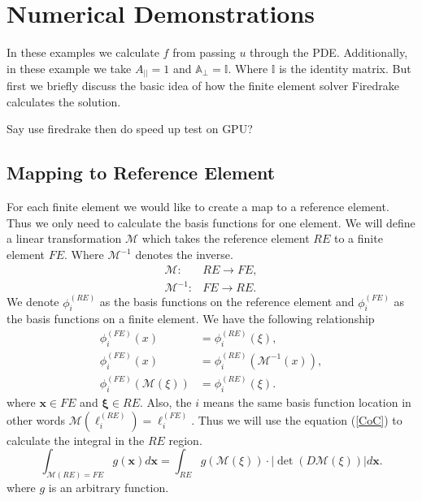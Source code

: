 \documentclass[12pt]{ociamthesis}
\begin{document}
\chapter{Numerical Demonstrations}
In these examples we calculate $f$ from passing $u$ through the PDE. Additionally, in these example we take $A_{||}=1$ and $\mathbb{A}_{\perp} = \mathbb{I}$. Where $\mathbb{I}$ is the identity matrix. But first we briefly discuss the basic idea of how the finite element solver Firedrake \cite{Dragon} calculates the solution. 

Say use firedrake then do speed up test on GPU?

\section{Mapping to Reference Element} \label{RE}
For each finite element we would like to create a map to a reference element. Thus we only need to calculate the basis functions for one element. We will define a linear transformation $\mathcal{M}$ which takes the reference element $RE$ to a finite element $FE$. Where $\mathcal{M}^{-1}$ denotes the inverse. 
\begin{align}
\mathcal{M}: &RE \rightarrow FE, \\
\mathcal{M}^{-1}: &FE \rightarrow RE.
\end{align}
We denote $\phi_i^{(RE)}$ as the basis functions on the reference element and $\phi_i^{(FE)}$ as the basis functions on a finite element. We have the following relationship
\begin{align}
\phi_i^{(FE)}(x) &= \phi_i^{(RE)}(\xi), \\
\phi_i^{(FE)}(x) &= \phi_i^{(RE)}(\mathcal{M}^{-1}(x)), \\
\phi_i^{(FE)}(\mathcal{M}(\xi)) &= \phi_i^{(RE)}(\xi).
\end{align}
where $\mathbf{x} \in FE$ and $\mathbf{\xi} \in RE$. Also, the $i$ means the same basis function location in other words $\mathcal{M}(\ell_i^{(RE)}) = \ell_i^{(FE)}$. Thus we will use the equation (\ref{CoC}) to calculate the integral in the $RE$ region.
\begin{equation} \label{CoC}
\int_{\mathcal{M}(RE)=FE}g(\mathbf{x}) d\mathbf{x} =
\int_{RE}g(\mathcal{M(\xi)})\cdot |\det(D\mathcal{M}(\xi))| d\mathbf{x}.
\end{equation}
where $g$ is an arbitrary function.
\end{document}
